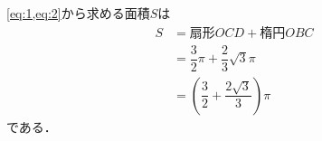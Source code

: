\documentclass[../../main.tex]{subfiles}
\begin{document}
\cref{eq:1,eq:2}から求める面積$S$は
\begin{align}
  S
  &=\text{扇形}OCD + \text{楕円}OBC \\
  &=\dfrac{3}{2}\pi+\dfrac{2}{3}\sqrt{3}\pi \\
  &=\left(\dfrac{3}{2}+\dfrac{2\sqrt{3}}{3}\right)\pi
\end{align}
である．

\newpage
\end{document}

